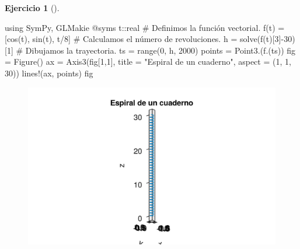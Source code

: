 \documentclass[
  a4paper,
]{scrreport}
\newenvironment{Shaded}{\begin{snugshade}}{\end{snugshade}}
\newcommand{\BuiltInTok}[1]{\textcolor[rgb]{0.00,0.23,0.31}{#1}}
\newcommand{\CommentTok}[1]{\textcolor[rgb]{0.37,0.37,0.37}{#1}}
\newcommand{\DataTypeTok}[1]{\textcolor[rgb]{0.68,0.00,0.00}{#1}}
\newcommand{\FloatTok}[1]{\textcolor[rgb]{0.68,0.00,0.00}{#1}}
\newcommand{\FunctionTok}[1]{\textcolor[rgb]{0.28,0.35,0.67}{#1}}
\newcommand{\ImportTok}[1]{\textcolor[rgb]{0.00,0.46,0.62}{#1}}
\newcommand{\NormalTok}[1]{\textcolor[rgb]{0.00,0.23,0.31}{#1}}
\newcommand{\OperatorTok}[1]{\textcolor[rgb]{0.37,0.37,0.37}{#1}}
\newcommand{\PreprocessorTok}[1]{\textcolor[rgb]{0.68,0.00,0.00}{#1}}
\newcommand{\StringTok}[1]{\textcolor[rgb]{0.13,0.47,0.30}{#1}}
\theoremstyle{definition}
\newtheorem{exercise}{Ejercicio}[chapter]
\theoremstyle{remark}
\begin{document}
\begin{exercise}[]
\begin{tcolorbox}
\begin{Shaded}
\begin{Highlighting}[]
\ImportTok{using} \BuiltInTok{SymPy}\NormalTok{, }\BuiltInTok{GLMakie}
\PreprocessorTok{@syms}\NormalTok{ t}\OperatorTok{::}\DataTypeTok{real}
\CommentTok{\# Definimos la función vectorial.}
\FunctionTok{f}\NormalTok{(t) }\OperatorTok{=}\NormalTok{ [}\FunctionTok{cos}\NormalTok{(t), }\FunctionTok{sin}\NormalTok{(t), t}\OperatorTok{/}\FloatTok{8}\NormalTok{]}
\CommentTok{\# Calculamos el número de revoluciones.}
\NormalTok{h }\OperatorTok{=} \FunctionTok{solve}\NormalTok{(}\FunctionTok{f}\NormalTok{(t)[}\FloatTok{3}\NormalTok{]}\OperatorTok{{-}}\FloatTok{30}\NormalTok{)[}\FloatTok{1}\NormalTok{]}
\CommentTok{\# Dibujamos la trayectoria.}
\NormalTok{ts }\OperatorTok{=} \FunctionTok{range}\NormalTok{(}\FloatTok{0}\NormalTok{, h, }\FloatTok{2000}\NormalTok{)}
\NormalTok{points }\OperatorTok{=} \FunctionTok{Point3}\NormalTok{.(}\FunctionTok{f}\NormalTok{.(ts))}
\NormalTok{fig }\OperatorTok{=} \FunctionTok{Figure}\NormalTok{()}
\NormalTok{ax }\OperatorTok{=} \FunctionTok{Axis3}\NormalTok{(fig[}\FloatTok{1}\NormalTok{,}\FloatTok{1}\NormalTok{], title }\OperatorTok{=} \StringTok{"Espiral de un cuaderno"}\NormalTok{, aspect }\OperatorTok{=}\NormalTok{ (}\FloatTok{1}\NormalTok{, }\FloatTok{1}\NormalTok{, }\FloatTok{30}\NormalTok{))}
\FunctionTok{lines!}\NormalTok{(ax, points)}
\NormalTok{fig}
\end{Highlighting}
\end{Shaded}

\begin{figure}[H]

{\centering \includegraphics{08-funciones-vectoriales_files/figure-pdf/cell-18-output-1.png}

}
\end{figure}
\end{tcolorbox}
\end{exercise}
\end{document}

